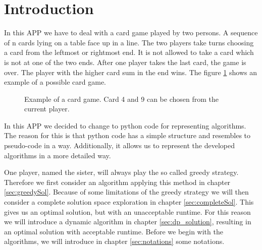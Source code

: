 \documentclass[a4paper,12pt,fleqn]{article}
\newcommand\ezskip{\medskip\noindent}
\begin{document}

\thispagestyle{empty}
\tableofcontents
\newpage
\section{Introduction} \label{sec:introduction}
In this APP we have to deal with a card game played by two persons.
A sequence of n cards lying on a table face up in a line. The two players take turns choosing a card from the leftmost or rightmost end. It is not allowed to take a card which is not at one of the two ends. After one player takes the last card, the game is over. The player with the higher card sum in the end wins. The figure \ref{fig:introductionExample} shows an example of a possible card game.

\begin{figure}[H]
    \centering
    \caption{Example of a card game. Card 4 and 9 can be chosen from the current player.}
    \label{fig:introductionExample}
\end{figure}

In this APP we decided to change to python code for representing algorithms.
The reason for this is that python code has a simple structure and resembles to
pseudo-code in a way. Additionally, it allows us to represent the developed
algorithms in a more detailed way.

\ezskip One player, named the sister, will always play the so called greedy strategy. Therefore we first consider an algorithm applying this method in chapter \ref{sec:greedySol}. Because of some limitations of the greedy strategy we will then consider a complete solution space exploration in chapter \ref{sec:completeSol}. This gives us an optimal solution, but with an unacceptable runtime. For this reason we will introduce a dynamic algorithm in chapter \ref{sec:dp_solution}, resulting in an optimal solution with acceptable runtime. Before we begin with the algorithms, we will introduce in chapter \ref{sec:notations} some notations. 
\end{document}
